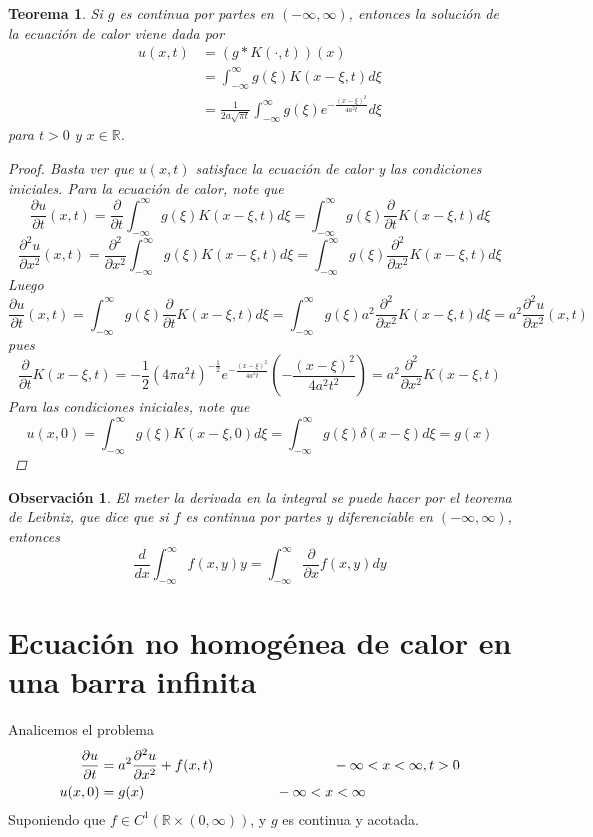 \documentclass[11pt]{book}
\theoremstyle{plain}
\newtheorem{teo}[proposición]{Teorema}
\newtheorem{obs}[proposición]{Observación}
\theoremstyle{definition}
\newcommand{\R}{\mathbb{R}}
\begin{document}
\begin{teo}
    Si $g$ es continua por partes en $(-\infty,\infty)$, entonces la solución de la ecuación de calor viene dada por
    \begin{align*}
        u(x,t) &= (g*K(\cdot,t))(x)\\
        &= \int_{-\infty}^{\infty} g(\xi)K(x-\xi,t)d\xi\\
        &= \frac{1}{2a\sqrt{\pi t}}\int_{-\infty}^{\infty}g(\xi)e^{-\frac{(x-\xi)^{2}}{4a^{2}t}}d\xi
    \end{align*}
    para $t>0$ y $x\in\R$.
    \begin{proof}
        Basta ver que $u(x,t)$ satisface la ecuación de calor y las condiciones iniciales. Para la ecuación de calor, note que
        \[\frac{\partial u}{\partial t}(x,t) = \frac{\partial}{\partial t} \int_{-\infty}^{\infty} g(\xi)K(x-\xi,t)d\xi = \int_{-\infty}^{\infty} g(\xi)\frac{\partial}{\partial t} K(x-\xi,t)d\xi\]
        \[\frac{\partial^2 u}{\partial x^2}(x,t) = \frac{\partial^2}{\partial x^2} \int_{-\infty}^{\infty} g(\xi)K(x-\xi,t)d\xi = \int_{-\infty}^{\infty} g(\xi)\frac{\partial^2}{\partial x^2} K(x-\xi,t)d\xi\]
        Luego
        \[\frac{\partial u}{\partial t}(x,t) = \int_{-\infty}^{\infty} g(\xi)\frac{\partial}{\partial t} K(x-\xi,t)d\xi = \int_{-\infty}^{\infty} g(\xi)a^{2}\frac{\partial^2}{\partial x^2} K(x-\xi,t)d\xi = a^{2}\frac{\partial^2 u}{\partial x^2}(x,t)\]
        pues
        \[\frac{\partial}{\partial t} K(x-\xi,t) = -\frac{1}{2}(4\pi a^{2}t)^{-\frac{1}{2}}e^{-\frac{(x-\xi)^{2}}{4a^{2}t}}\left(-\frac{(x-\xi)^{2}}{4a^{2}t^{2}}\right) = a^{2}\frac{\partial^2}{\partial x^2} K(x-\xi,t)\]
        Para las condiciones iniciales, note que
        \[u(x,0) = \int_{-\infty}^{\infty} g(\xi)K(x-\xi,0)d\xi = \int_{-\infty}^{\infty} g(\xi)\delta(x-\xi)d\xi = g(x)\]
    \end{proof}
\end{teo}

\begin{obs}
    El meter la derivada en la integral se puede hacer por el teorema de Leibniz, que dice que si $f$ es continua por partes y diferenciable en $(-\infty,\infty)$, entonces
    \[
    \frac{d}{dx} \int_{-\infty}^{\infty} f(x,y)y = \int_{-\infty}^{\infty} \frac{\partial}{\partial x} f(x,y)dy  
    \]    
\end{obs}

\section{Ecuación no homogénea de calor en una barra infinita}
Analicemos el problema
\setcounter{equation}{0}
\begin{align}
    \frac{\partial u}{\partial t} &= a^{2} \frac{\partial^2 u}{\partial x^2} + f(x,t) \hspace{30mm} -\infty<x<\infty, t > 0\\ 
    u(x,0)&= g(x) \hspace{33mm} -\infty<x<\infty
\end{align}
Suponiendo que $f \in C^{1}(\R \times (0,\infty))$, y $g$ es continua y acotada.
\end{document}
